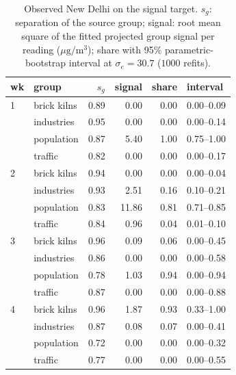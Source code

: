 \begin{table}[t]
\centering
\footnotesize
\setlength{\tabcolsep}{2.5pt}
\caption{Observed New Delhi on the signal target.  \(s_g\): separation of the source
group; signal: root mean square of the fitted projected group signal per reading
(\(\mu\mathrm g/\mathrm m^3\)); share with 95\% parametric-bootstrap interval
at \(\sigma_e=30.7\) (\(1000\) refits).}
\label{tab:results_nd_signal}
\begin{tabular}{llrrrl}
\toprule
wk & group & \(s_g\) & signal & share & interval \\
\midrule
1 & brick kilns & 0.89 & 0.00 & 0.00 & 0.00--0.09 \\
 & industries & 0.95 & 0.00 & 0.00 & 0.00--0.14 \\
 & population & 0.87 & 5.40 & 1.00 & 0.75--1.00 \\
 & traffic & 0.82 & 0.00 & 0.00 & 0.00--0.17 \\
\midrule
2 & brick kilns & 0.94 & 0.00 & 0.00 & 0.00--0.04 \\
 & industries & 0.93 & 2.51 & 0.16 & 0.10--0.21 \\
 & population & 0.83 & 11.86 & 0.81 & 0.71--0.85 \\
 & traffic & 0.84 & 0.96 & 0.04 & 0.01--0.10 \\
\midrule
3 & brick kilns & 0.96 & 0.09 & 0.06 & 0.00--0.45 \\
 & industries & 0.86 & 0.00 & 0.00 & 0.00--0.58 \\
 & population & 0.78 & 1.03 & 0.94 & 0.00--0.94 \\
 & traffic & 0.87 & 0.00 & 0.00 & 0.00--0.88 \\
\midrule
4 & brick kilns & 0.96 & 1.87 & 0.93 & 0.33--1.00 \\
 & industries & 0.87 & 0.08 & 0.07 & 0.00--0.41 \\
 & population & 0.72 & 0.00 & 0.00 & 0.00--0.32 \\
 & traffic & 0.77 & 0.00 & 0.00 & 0.00--0.55 \\
\bottomrule
\end{tabular}
\end{table}

